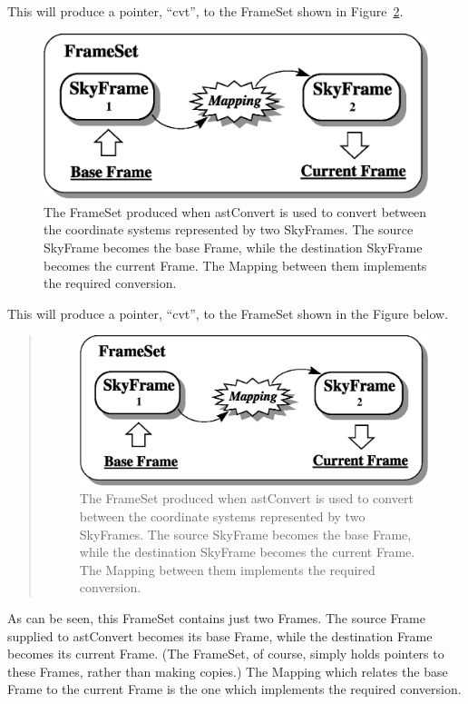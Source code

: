 \documentclass[twoside,11pt]{article}
\newenvironment{latexonly}{}{}
\newcommand{\htmlref}[2]{#1}
\begin{document}
\begin{latexonly}
   This will produce a pointer, ``cvt'', to the FrameSet shown in
   Figure~\ref{fig:fsconvert}.
   \begin{figure}[bhtp]
   \begin{center}
   \includegraphics[scale=0.65]{sun211_figures/fsconvert.eps}
   \caption{The FrameSet produced when astConvert is used to convert
   between the coordinate systems represented by two SkyFrames. The
   source \htmlref{SkyFrame}{SkyFrame} becomes the base Frame, while the destination SkyFrame
   becomes the current Frame. The \htmlref{Mapping}{Mapping} between them implements the
   required conversion.}
   \label{fig:fsconvert}
   \end{center}
   \end{figure}
\end{latexonly}
\begin{htmlonly}
   This will produce a pointer, ``cvt'', to the FrameSet shown in the
   Figure below.
   \begin{quote}
   \begin{figure}[bhtp]
   \label{fig:fsconvert}
   \includegraphics[scale=1.0]{sun211_figures/fsconvert.eps}
   \caption{The FrameSet produced when astConvert is used to convert
   between the coordinate systems represented by two SkyFrames. The
   source SkyFrame becomes the base Frame, while the destination SkyFrame
   becomes the current Frame. The Mapping between them implements the
   required conversion.}
   \end{figure}
   \end{quote}
\end{htmlonly}
As can be seen, this FrameSet contains just two Frames.  The source
Frame supplied to astConvert becomes its base Frame, while the
destination Frame becomes its current Frame. (The FrameSet, of course,
simply holds pointers to these Frames, rather than making copies.) The
Mapping which relates the base Frame to the current Frame is the one
which implements the required conversion.
\end{document}
